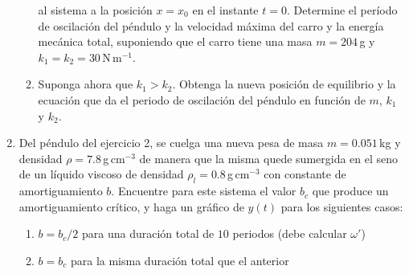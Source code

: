 \documentclass[a4paper,12pt]{article}
\begin{document}
\begin{enumerate}
\begin{enumerate}
				al sistema a la posición $x=x_0$ en el instante $t=0$.
				Determine el período de oscilación del péndulo y la velocidad
				máxima del carro y la energía mecánica total, suponiendo que el
				carro tiene una masa $m=204$\,g y $k_1=k_2=30$\,N\,m$^{-1}$.
			\item Suponga ahora que $k_1 > k_2$. Obtenga la nueva posición de
				equilibrio y la ecuación que da el periodo de oscilación del
				péndulo en función de $m$, $k_1$ y $k_2$. 
		\end{enumerate}
	\item Del péndulo del ejercicio 2, se cuelga una nueva pesa de masa
		$m=0.051$\,kg y densidad $\rho=7.8$\,g\,cm$^{-3}$ de manera que la
		misma quede sumergida en el seno de un líquido viscoso de densidad
		$\rho_l=0.8$\,g\,cm$^{-3}$ con constante de amortiguamiento $b$.
		Encuentre para este sistema el valor $b_c$ que produce un
		amortiguamiento crítico, y haga un gráfico de $y(t)$ para los
		siguientes casos: 
		\begin{enumerate}
			\item $b=b_c / 2$ para una duración total de $10$ periodos (debe
				calcular $\omega'$)
			\item $b=b_c$ para la misma duración total que el anterior
		\end{enumerate}
\end{enumerate}
\end{document}
